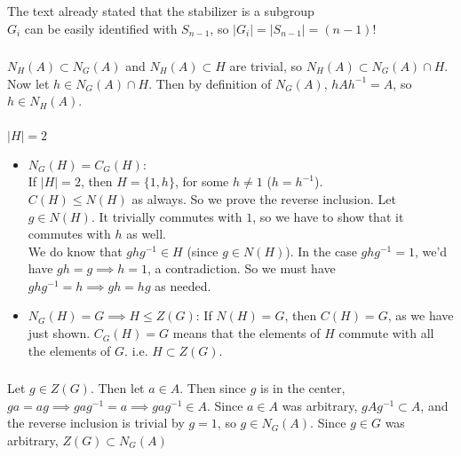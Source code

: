 \documentclass{article}
\newcommand{\set}[1]{ \{ #1 \} }
\newcommand{\inv}[1]{ {#1}^{-1} }
\newcommand{\norm}[1]{|#1|}
\begin{document}
\subsubsection{}\label{ex2p8}
The text already stated that the stabilizer is a subgroup\\
$G_i$ can be easily identified with $S_{n-1}$, so $\norm{G_i} = \norm{S_{n-1}} = (n-1)!$
\subsubsection{}\label{ex2p9}
$N_H(A) \subset N_G(A)$ and $N_H(A) \subset H$ are trivial, so $N_H(A) \subset N_G(A) \cap H$.\\
Now let $h \in N_G(A) \cap H$. Then by definition of $N_G(A)$, $hA\inv{h} = A$, so $h \in N_H(A)$. 
\subsubsection{}\label{ex2p10}
$\norm{H} = 2$\\
\begin{itemize}
\item $N_G(H) = C_G(H)$:\\
If $\norm{H} = 2$, then $H=\set{1,h}$, for some $h \neq 1$ ($h = \inv{h}$).\\
$C(H) \leq N(H)$ as always. So we prove the reverse inclusion. Let $g \in N(H)$. It trivially commutes with $1$, so we have to show that it commutes with $h$ as well.\\
We do know that $gh\inv{g} \in H$ (since $g \in N(H)$). In the case $gh\inv{g} = 1$, we'd have $gh = g \implies h=1$, a contradiction. So we must have $gh\inv{g} = h \implies gh=hg$ as needed.
\item $N_G(H) = G \implies H \leq Z(G)$:
If $N(H) = G$, then $C(H) = G$, as we have just shown. $C_G(H) = G$ means that the elements of $H$ commute with all the elements of $G$. i.e. $H \subset Z(G)$.
\end{itemize}
\subsubsection{}\label{ex2p11}
Let $g \in Z(G)$. Then let $a\in A$. Then since $g$ is in the center, $ga=ag\implies ga\inv{g} = a \implies ga\inv{g} \in A$. Since $a \in A$ was arbitrary, $gA\inv{g} \subset A$, and the reverse inclusion is trivial by $g=1$, so $g\in N_G(A)$. Since $g\in G$ was arbitrary, $Z(G) \subset N_G(A)$
\end{document}

